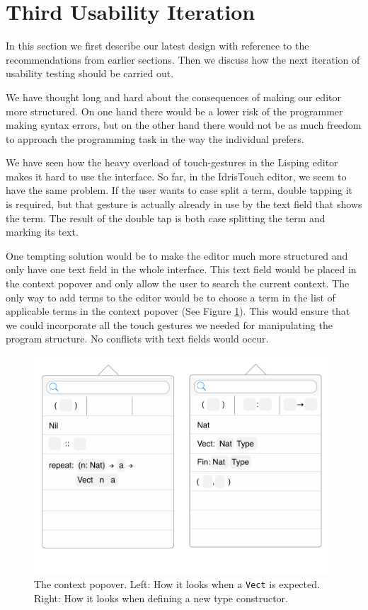 \section{Third Usability Iteration}
In this section we first describe our latest design with reference to the
recommendations from earlier sections. Then we discuss how the next iteration
of usability testing should be carried out.

We have thought long and hard about the consequences of making our editor more
structured. On one hand there would be a lower risk of the programmer making  syntax errors, but on the other hand there would not be as much freedom to approach
the programming task in the way the individual prefers.

We have seen how the heavy overload of touch-gestures in the Lisping editor makes it hard to use
the interface. So far, in the IdrisTouch editor, we seem to have the same
problem. If the user wants to case split a term, double tapping it is required,
but that gesture is actually already in use by the text field that shows the
term. The result of the double tap is both case splitting the term and marking
its text.

One tempting solution would be to make the editor much more structured and only
have one text field in the whole interface. This text field would be placed in
the context popover and only allow the user to search the current context. The only way to add terms to the editor would be to choose a term in the list of applicable terms in the context popover (See Figure \ref{fig:new_design_popover}). This
would ensure that we could incorporate all the touch gestures we needed for
manipulating the program structure. No conflicts with text fields would occur.

\begin{figure}
	\centering
		\includegraphics[width=110mm]{diagrams/final_design_popover.pdf}
	\caption{The context popover. Left: How it looks when a \texttt{Vect} is
	expected. Right: How it looks when defining a new type constructor.}
\label{fig:new_design_popover}
\end{figure}

